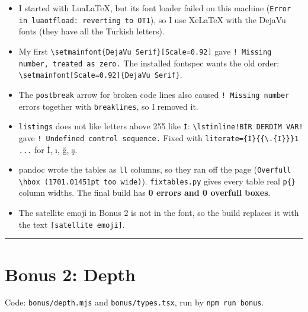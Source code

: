 \begin{itemize}
\tightlist
\item
  I started with LuaLaTeX, but its font loader failed on this machine (\passthrough{\lstinline!Error in luaotfload: reverting to OT1!}), so I use XeLaTeX with the DejaVu fonts (they have all the Turkish letters).
\item
  My first \passthrough{\lstinline!\\setmainfont\{DejaVu Serif\}[Scale=0.92]!} gave \passthrough{\lstinline"! Missing number, treated as zero."} The installed fontspec wants the old order: \passthrough{\lstinline!\\setmainfont[Scale=0.92]\{DejaVu Serif\}!}.
\item
  The \passthrough{\lstinline!postbreak!} arrow for broken code lines also caused \passthrough{\lstinline"! Missing number"} errors together with \passthrough{\lstinline!breaklines!}, so I removed it.
\item
  \passthrough{\lstinline!listings!} does not like letters above 255 like \passthrough{\lstinline!İ!}: \passthrough{\lstinline"\\lstinline!BİR DERDİM VAR!"} gave \passthrough{\lstinline"! Undefined control sequence."} Fixed with \passthrough{\lstinline!literate=\{İ\}\{\{\\.\{I\}\}\}1 ...!} for İ, ı, ğ, ş.
\item
  pandoc wrote the tables as \passthrough{\lstinline!ll!} columns, so they ran off the page (\passthrough{\lstinline!Overfull \\hbox (1701.01451pt too wide)!}). \passthrough{\lstinline!fixtables.py!} gives every table real \passthrough{\lstinline!p\{\}!} column widths. The final build has \textbf{0 errors and 0 overfull boxes}.
\item
  The satellite emoji in Bonus 2 is not in the font, so the build replaces it with the text \passthrough{\lstinline![satellite emoji]!}.
\end{itemize}

\begin{center}\rule{0.5\linewidth}{0.5pt}\end{center}

\hypertarget{bonus-2-depth}{%
\section{Bonus 2: Depth}\label{bonus-2-depth}}

Code: \passthrough{\lstinline!bonus/depth.mjs!} and \passthrough{\lstinline!bonus/types.tsx!}, run by \passthrough{\lstinline!npm run bonus!}.

